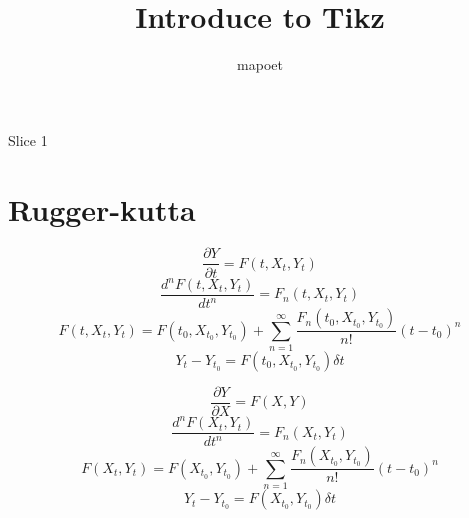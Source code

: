 \documentclass{beamer}
\author{mapoet}
\institute{Shao}
\title{Introduce to Tikz}
\begin{document}
\begin{frame}{Slice 1}
\maketitle
{}
\end{frame}
\section{Rugger-kutta}
\begin{frame}
$$\frac{\partial Y}{\partial t}=F(t,X_t,Y_t)$$
$$\frac{d^n F(t,X_t,Y_t)}{d t^n}=F_n(t,X_t,Y_t)$$
$$F(t,X_t,Y_t)=F(t_0,X_{t_0},Y_{t_0})+\sum_{n=1}^{\infty}{\frac{F_n(t_0,X_{t_0},Y_{t_0})}{n!}(t-t_0)^n}$$
$$Y_t - Y_{t_0}=F(t_0,X_{t_0},Y_{t_0}){\delta t}$$

\end{frame}
\begin{frame}
$$\frac{\partial Y}{\partial X}=F(X,Y)$$
$$\frac{d^n F(X_t,Y_t)}{d t^n}=F_n(X_t,Y_t)$$
$$F(X_t,Y_t)=F(X_{t_0},Y_{t_0})+\sum_{n=1}^{\infty}{\frac{F_n(X_{t_0},Y_{t_0})}{n!}(t-t_0)^n}$$
$$Y_t - Y_{t_0}=F(X_{t_0},Y_{t_0}){\delta t}$$

\end{frame}
\end{document}
